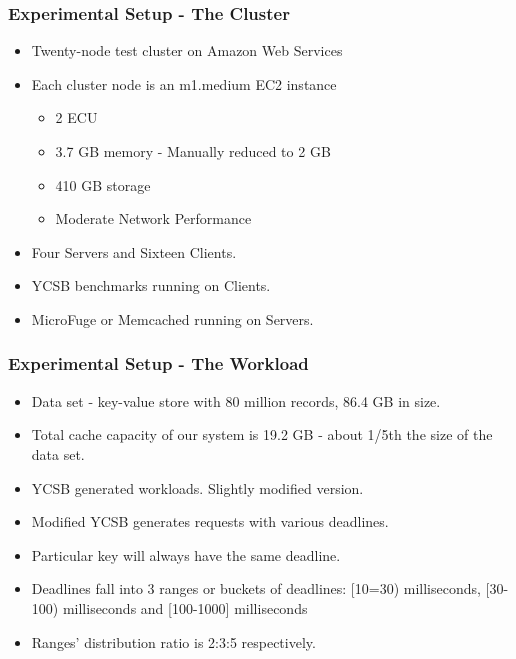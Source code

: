 \documentclass{beamer}
\begin{document}
\begin{frame}
\frametitle{Experimental Setup - The Cluster}
\begin{itemize}
\item Twenty-node test cluster on Amazon Web Services
\item Each cluster node is an m1.medium EC2 instance
\begin{itemize}
\item 2 ECU
\item 3.7 GB memory - Manually reduced to 2 GB
\item 410 GB storage
\item Moderate Network Performance
\end{itemize}
\item Four Servers and Sixteen Clients.
\item YCSB benchmarks running on Clients.
\item MicroFuge or Memcached running on Servers.
\end{itemize}
\end{frame}


\begin{frame}
\frametitle{Experimental Setup - The Workload}
\begin{itemize}
\item Data set - key-value store with 80 million records, 86.4 GB in size.
\item Total cache capacity of our system is 19.2 GB - about 1/5th the size of the data set.
\item YCSB generated workloads. Slightly modified version.
\item Modified YCSB generates requests with various deadlines.
\item Particular key will always have the same deadline.
\item Deadlines fall into 3 ranges or buckets of deadlines:
[10=30) milliseconds, [30-100) milliseconds and [100-1000] milliseconds
\item Ranges' distribution ratio is 2:3:5 respectively.
\end{itemize}
\end{frame}
\end{document}
